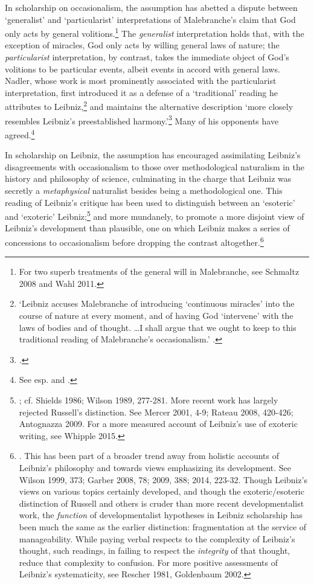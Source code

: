 \documentclass{article}
\begin{document}
In scholarship on occasionalism, the assumption has abetted a dispute
between `generalist' and `particularist' interpretations of
Malebranche's claim that God only acts by general volitions.\footnote{For
  two superb treatments of the general will in Malebranche, see Schmaltz
  2008 and Wahl 2011.} The \emph{generalist} interpretation holds that,
with the exception of miracles, God only acts by willing general laws of
nature; the \emph{particularist} interpretation, by contrast, takes the
immediate object of God's volitions to be particular events, albeit
events in accord with general laws. Nadler, whose work is most
prominently associated with the particularist interpretation, first
introduced it as a defense of a `traditional' reading he attributes to
Leibniz,\footnote{`Leibniz accuses Malebranche of introducing
  `continuous miracles' into the course of nature at every moment, and
  of having God `intervene' with the laws of bodies and of thought.
  \ldots I shall argue that we ought to keep to this traditional
  reading of Malebranche's occasionalism.' \autocite[32]{Nadler1993}.} and
maintains the alternative description `more closely resembles Leibniz's
preestablished harmony.'\footnote{\autocite[31]{Nadler1993}.} Many of his
opponents have agreed.\footnote{See esp. \autocite{Clarke1995} and \autocite{Scott1997}.}

In scholarship on Leibniz, the assumption has encouraged assimilating
Leibniz's disagreements with occasionalism to those over methodological
naturalism in the history and philosophy of science, culminating in the
charge that Leibniz was secretly a \emph{metaphysical} naturalist
besides being a methodological one. This reading of Leibniz's critique
has been used to distinguish between an `esoteric' and `exoteric'
Leibniz;\footnote{\autocite{Russell1951}; cf. Shields 1986; Wilson 1989, 277-281.
  More recent work has largely rejected Russell's distinction. See
  Mercer 2001, 4-9; Rateau 2008, 420-426; Antognazza 2009. For a more
  measured account of Leibniz's use of exoteric writing, see Whipple
  2015.} and more mundanely, to promote a more disjoint view of
Leibniz's development than plausible, one on which Leibniz makes a
series of concessions to occasionalism before dropping the contrast
altogether.\footnote{\autocite{Scott1997}. This has been part of a broader trend
  away from holistic accounts of Leibniz's philosophy and towards views
  emphasizing its development. See Wilson 1999, 373; Garber 2008, 78;
  2009, 388; 2014, 223-32. Though Leibniz's views on various topics
  certainly developed, and though the exoteric/esoteric distinction of
  Russell and others is cruder than more recent developmentalist work,
  the \emph{function} of developmentalist hypotheses in Leibniz
  scholarship has been much the same as the earlier distinction:
  fragmentation at the service of manageability. While paying verbal
  respects to the complexity of Leibniz's thought, such readings, in
  failing to respect the \emph{integrity} of that thought, reduce that
  complexity to confusion. For more positive assessments of Leibniz's
  systematicity, see Rescher 1981, Goldenbaum 2002.}
\end{document}
